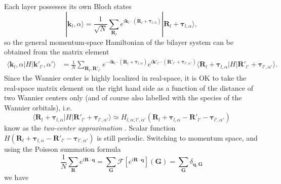 Each layer possesses its own Bloch states
\begin{equation*}
    |\bm k_l,\alpha\rangle =\dfrac{1}{\sqrt N}\sum_{\bm R_l} e^{i\bm k_l\cdot(\bm R_l+\bm\tau_{l,\alpha})}|\bm R_l+\bm\tau_{l,\alpha}\rangle,
\end{equation*}
so the general momentum-space Hamiltonian of the bilayer system can be obtained from the matrix element
\begin{align*}
    \langle\bm k_l,\alpha|H|\bm k'_{l'},\alpha'\rangle & =\frac{1}{N}\sum_{\bm R_l,\bm R'_{l'}}e^{-i\bm k_l\cdot(\bm R_l+\bm\tau_{l,\alpha})}e^{i\bm k'_{l'}\cdot(\bm R'_{l'}+\bm\tau_{l',\alpha'})}\langle\bm R_l+\bm\tau_{l,\alpha}|H|\bm R'_{l'}+\bm\tau_{l',\alpha'}\rangle.
\end{align*}
Since the Wannier center is highly localized in real-space, it is OK to take the real-space matrix element on the right hand side as a function of the distance of two Wannier centers only (and of course also labelled with the species of the Wannier orbitals), i.e.
\begin{equation*}
    \langle\bm R_l+\bm\tau_{l,\alpha}|H|\bm R'_{l'}+\bm\tau_{l',\alpha'}\rangle\simeq H_{l,\alpha;l',\alpha'}(\bm R_l+\bm\tau_{l,\alpha}-\bm R'_{l'}-\bm\tau_{l',\alpha'})
\end{equation*}
know as the \emph{two-center approximation} \cite{bistritzer2011moire}. Scalar function $H(\bm R_l+\bm\tau_{l,\alpha}-\bm R'_{l'}-\bm\tau_{l',\alpha'})$ is still periodic. Switching to momentum space, and using the Poisson summation formula
\begin{equation*}
    \frac{1}{N}\sum_{\bm R}e^{i\bm R\cdot\bm q}=\sum_{\bm G}\mathcal F[e^{i\bm R\cdot\bm q}](\bm G)=\sum_{\bm G}\delta_{\bm q,\bm G}
\end{equation*}
we have
